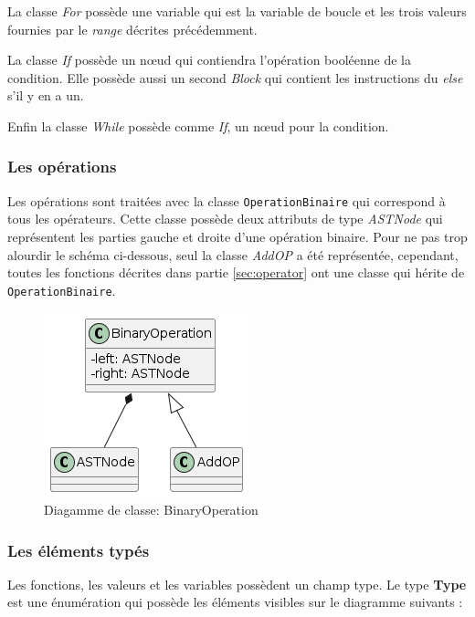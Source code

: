 \documentclass[a4paper]{article}%
\begin{document}
La classe \textit{For} possède une variable qui est la variable de boucle et les
trois valeurs fournies par le \textit{range} décrites précédemment.

La classe \textit{If} possède un nœud qui contiendra l'opération booléenne de la
condition. Elle possède aussi un second \textit{Block} qui contient les
instructions du \textit{else} s'il y en a un.

Enfin la classe \textit{While} possède comme \textit{If}, un nœud pour la
condition.

\subsubsection*{Les opérations}

Les opérations sont traitées avec la classe \lstinline{OperationBinaire} qui
correspond à tous les opérateurs. Cette classe possède deux attributs de type
\textit{ASTNode} qui représentent les parties gauche et droite d'une opération
binaire. Pour ne pas trop alourdir le schéma ci-dessous, seul la classe
\textit{AddOP} a été représentée, cependant, toutes les fonctions décrites dans
partie \ref{sec:operator} ont une classe qui hérite de
\lstinline{OperationBinaire}.
\clearpage

\begin{figure}[h!]
  \begin{center}
  \includegraphics[scale=0.5]{../ressources/diagrams/binaryOp.png}
  \caption{Diagamme de classe: BinaryOperation}
  \end{center}
\end{figure}

\subsubsection*{Les éléments typés}
\label{sec:eltTypes}

Les fonctions, les valeurs et les variables possèdent un champ type. Le type
\textbf{Type} est une énumération qui possède les éléments visibles sur le
diagramme suivants :
\end{document}
